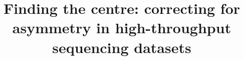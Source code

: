 \documentclass{bmcart}
\begin{document}
\begin{frontmatter}

\begin{fmbox}


\title{Finding the centre: correcting for asymmetry in high-throughput sequencing datasets}


\author[
   addressref={aff1},                   %
   email={jia_wu@hotmail.com}   %
]{ }
\author[
   addressref={aff1},                   %
   email={jean.macklaim@gmail.com}   %
]{ }
\author[
   addressref={aff1},                   %
   email={bgenge3@gmail.com}   %
]{ }
\author[
   addressref={aff1,aff2},
   corref={aff1},
   email={ggloor@uwo.ca}
]{ }


\address[id=aff1]{%
  , %
  ,                     %
  ,                              %
}
\address[id=aff2]{%
  ,
  ,
  ,
}


\end{fmbox}
\end{frontmatter}
\end{document}
